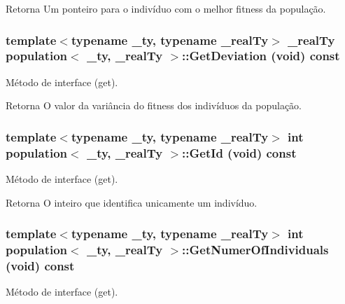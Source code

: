 \begin{DoxyReturn}{Retorna}
Um ponteiro para o indivíduo com o melhor fitness da população. 
\end{DoxyReturn}
\hypertarget{classpopulation_abe769cd333fa71228e6a89da1171fd93}{
\subsubsection[{GetDeviation}]{\setlength{\rightskip}{0pt plus 5cm}template$<$typename \_\-ty, typename \_\-realTy$>$ \_\-realTy {\bf population}$<$ \_\-ty, \_\-realTy $>$::GetDeviation (void) const}}
\label{classpopulation_abe769cd333fa71228e6a89da1171fd93}
Método de interface (get).

\begin{DoxyReturn}{Retorna}
O valor da variância do fitness dos indivíduos da população. 
\end{DoxyReturn}
\hypertarget{classpopulation_a15aee31f3669a3819a025d0c88fd559b}{
\subsubsection[{GetId}]{\setlength{\rightskip}{0pt plus 5cm}template$<$typename \_\-ty, typename \_\-realTy$>$ int {\bf population}$<$ \_\-ty, \_\-realTy $>$::GetId (void) const}}
\label{classpopulation_a15aee31f3669a3819a025d0c88fd559b}
Método de interface (get).

\begin{DoxyReturn}{Retorna}
O inteiro que identifica unicamente um indivíduo. 
\end{DoxyReturn}
\hypertarget{classpopulation_aa8d33d15eef1966482d052ff509bc638}{
\subsubsection[{GetNumerOfIndividuals}]{\setlength{\rightskip}{0pt plus 5cm}template$<$typename \_\-ty, typename \_\-realTy$>$ int {\bf population}$<$ \_\-ty, \_\-realTy $>$::GetNumerOfIndividuals (void) const}}
\label{classpopulation_aa8d33d15eef1966482d052ff509bc638}
Método de interface (get).

